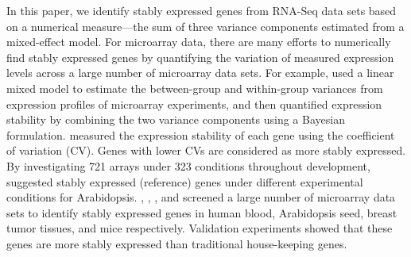 \documentclass[letterpaper,12pt]{article}
\begin{document}
In this paper, we identify stably expressed genes from RNA-Seq data sets based
on a numerical measure---the sum of three variance components estimated from a
mixed-effect model. 
For microarray data, there are many efforts to numerically find stably
expressed genes by quantifying the variation of measured expression levels
across a large number of microarray data sets.  For example,
\cite{andersen2004normalization} used a linear mixed model to estimate the
between-group and within-group variances from expression profiles of
microarray experiments, and then quantified expression stability by combining
the two variance components using a Bayesian formulation. 
\cite{czechowski2005genome} measured the expression stability of each gene
using the coefficient of variation (CV). Genes with lower CVs are considered
as more stably expressed.  By investigating 721 arrays under 323 conditions
throughout development, \cite{czechowski2005genome} suggested stably expressed
(reference) genes under different experimental conditions for Arabidopsis.
\cite{stamova2009identification},  \citet{dekkers2012identification}, \citet{gur2009identification}, and
 \citet{frericks2008toolbox} screened a large number of microarray data sets
 to identify stably expressed genes in human blood, Arabidopsis seed, breast tumor tissues,
 and mice respectively.
Validation experiments \citep{czechowski2005genome,
dekkers2012identification, huggett2005real,stamova2009identification} showed
that these genes are more stably expressed than traditional house-keeping
genes.  

\end{document}

